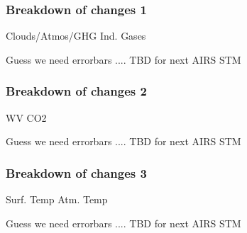 \documentclass[10pt,t]{beamer}
\begin{document}
\begin{frame}
  \frametitle{Breakdown of changes 1}
  \hspace{0.50in} Clouds/Atmos/GHG  \hspace{1.5in} Ind. Gases \\
  \begin{center}
  \end{center}

 Guess we need errorbars .... TBD for next AIRS STM
\end{frame}

\begin{frame}
  \frametitle{Breakdown of changes 2}
  \hspace{0.50in} WV  \hspace{1.5in} CO2 \\
  \begin{center}
  \end{center}

 Guess we need errorbars .... TBD for next AIRS STM
\end{frame}

\begin{frame}
  \frametitle{Breakdown of changes 3}
  \hspace{0.50in} Surf. Temp  \hspace{1.5in} Atm. Temp \\
  \begin{center}
  \end{center}

 Guess we need errorbars .... TBD for next AIRS STM
\end{frame}
\end{document}
